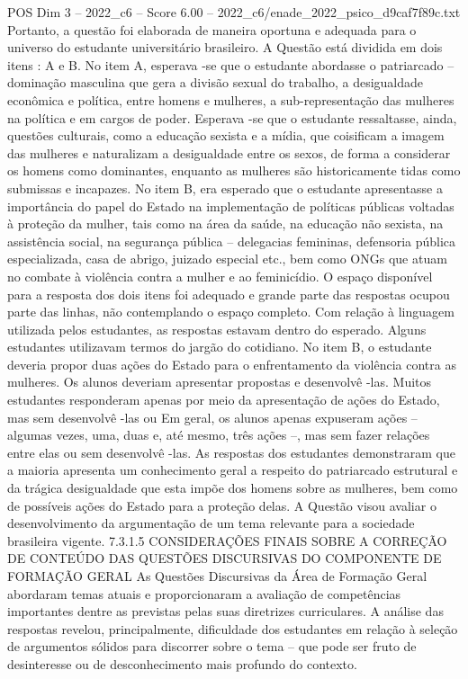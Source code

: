 \begin{textsample}{POS Dim 3 – 2022\_c6 – Score 6.00 – 2022\_c6/enade\_2022\_psico\_d9caf7f89c.txt}
Portanto, a questão foi elaborada de maneira oportuna e adequada para o universo do estudante universitário brasileiro.
A Questão está dividida em dois itens : A e B.
No item A, esperava -se que o estudante abordasse o patriarcado – dominação masculina que gera a divisão sexual do trabalho, a desigualdade econômica e política, entre homens e mulheres, a sub-representação das mulheres na política e em cargos de poder.
Esperava -se que o estudante ressaltasse, ainda, questões culturais, como a educação sexista e a mídia, que coisificam a imagem das mulheres e naturalizam a desigualdade entre os sexos, de forma a considerar os homens como dominantes, enquanto as mulheres são historicamente tidas como submissas e incapazes.
No item B, era esperado que o estudante apresentasse a importância do papel do Estado na implementação de políticas públicas voltadas à proteção da mulher, tais como na área da saúde, na educação não sexista, na assistência social, na segurança pública – delegacias femininas, defensoria pública especializada, casa de abrigo, juizado especial etc., bem como ONGs que atuam no combate à violência contra a mulher e ao feminicídio.
O espaço disponível para a resposta dos dois itens foi adequado e grande parte das respostas ocupou parte das linhas, não contemplando o espaço completo.
Com relação à linguagem utilizada pelos estudantes, as respostas estavam dentro do esperado.
Alguns estudantes utilizavam termos do jargão do cotidiano.
No item B, o estudante deveria propor duas ações do Estado para o enfrentamento da violência contra as mulheres.
Os alunos deveriam apresentar propostas e desenvolvê -las.
Muitos estudantes responderam apenas por meio da apresentação de ações do Estado, mas sem desenvolvê -las ou Em geral, os alunos apenas expuseram ações – algumas vezes, uma, duas e, até mesmo, três ações –, mas sem fazer relações entre elas ou sem desenvolvê -las.
As respostas dos estudantes demonstraram que a maioria apresenta um conhecimento geral a respeito do patriarcado estrutural e da trágica desigualdade que esta impõe dos homens sobre as mulheres, bem como de possíveis ações do Estado para a proteção delas.
A Questão visou avaliar o desenvolvimento da argumentação de um tema relevante para a sociedade brasileira vigente. 7.3.1.5 CONSIDERAÇÕES FINAIS SOBRE A CORREÇÃO DE CONTEÚDO DAS QUESTÕES DISCURSIVAS DO COMPONENTE DE FORMAÇÃO GERAL As Questões Discursivas da Área de Formação Geral abordaram temas atuais e proporcionaram a avaliação de competências importantes dentre as previstas pelas suas diretrizes curriculares.
A análise das respostas revelou, principalmente, dificuldade dos estudantes em relação à seleção de argumentos sólidos para discorrer sobre o tema – que pode ser fruto de desinteresse ou de desconhecimento mais profundo do contexto.

\end{textsample}
